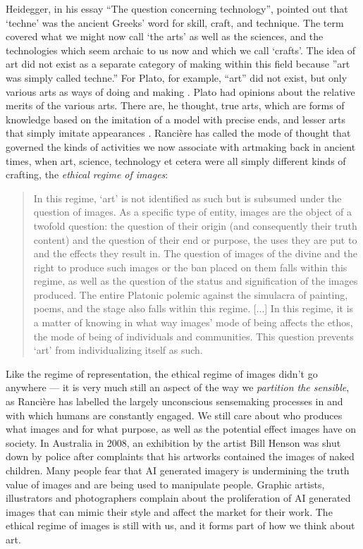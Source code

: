 \documentclass[letterpaper]{article}
\begin{document}
    Heidegger, in his essay “The question concerning technology”, pointed out that ‘techne’ was the ancient Greeks' word for skill, craft, and technique. The term covered what we might now call ‘the arts’ as well as the sciences, and the technologies which seem archaic to us now and which we call ‘crafts’. The idea of art did not exist as a separate category of making within this field because ”art was simply called techne.” \citep[p34]{HeideggerThQstnCncrngTchnlgy1954} For Plato, for example, “art” did not exist, but only various arts as ways of doing and making \citep[p.20]{RancierPltcsOfThAsthtcs2004}. Plato had opinions about the relative merits of the various arts. There are, he thought, true arts, which are forms of knowledge based on the imitation of a model with precise ends, and lesser arts that simply imitate appearances \citep[p.20]{RancierPltcsOfThAsthtcs2004}.  Rancière has called the mode of thought that governed the kinds of activities we now associate with artmaking back in ancient times, when art, science, technology et cetera were all simply different kinds of crafting, the \emph{ethical regime of images}:

    \begin{quote}
        In this regime, ‘art’ is not identified as such but is subsumed under the question of images. As a specific type of entity, images are the object of a twofold question: the question of their origin (and consequently their truth content) and the question of their end or purpose, the uses they are put to and the effects they result in. The question of images of the divine and the right to produce such images or the ban placed on them falls within this regime, as well as the question of the status and signification of the images produced. The entire Platonic polemic against the simulacra of painting, poems, and the stage also falls within this regime. [...] In this regime, it is a matter of knowing in what way images' mode of being affects the ethos, the mode of being of individuals and communities. This question prevents ‘art’ from individualizing itself as such. \citep[pp.20-21]{RancierPltcsOfThAsthtcs2004}
    \end{quote}

    Like the regime of representation, the ethical regime of images didn't go anywhere — it is very much still an aspect of the way we \emph{partition the sensible}, as Rancière has labelled the largely unconscious sensemaking processes in and with which humans are constantly engaged. We still care about who produces what images and for what purpose, as well as the potential effect images have on society. In Australia in 2008, an exhibition by the artist Bill Henson was shut down by police after complaints that his artworks contained the images of naked children. Many people fear that AI generated imagery is undermining the truth value of images and are being used to manipulate people. Graphic artists, illustrators and photographers complain about the proliferation of AI generated images that can mimic their style and affect the market for their work. The ethical regime of images is still with us, and it forms part of how we think about art. 
\end{document}
